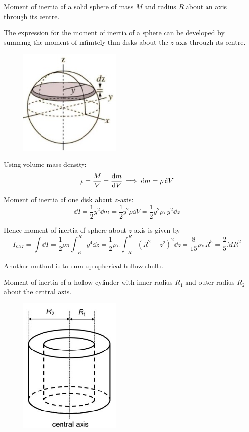 \begin{exmp}{}{}
Moment of inertia of a solid sphere of mass $M$ and radius $R$ about an axis through its centre.
\end{exmp}

\begin{solution}
The expression for the moment of inertia of a sphere can be developed by summing the moment of infinitely thin disks about the $z$-axis through its centre.

\begin{figure}[H]
    \centering
    \includegraphics[width=5cm]{images/moi_sphere.jpg}
\end{figure}

Using volume mass density:
\[ \rho = \frac{M}{V} = \dv{m}{V} \implies \dd{m} = \rho\dd{V} \]

Moment of inertia of one disk about $z$-axis:
\[ \dd{I} = \frac{1}{2}y^2\dd{m} = \frac{1}{2}y^2\rho\dd{V} = \frac{1}{2}y^2\rho\pi y^2\dd{z} \]

Hence moment of inertia of sphere about $z$-axis is given by
\[ I_{CM} = \int \dd{I} = \frac{1}{2}\rho\pi\int_{-R}^R y^4\dd{z} = \frac{1}{2}\rho\pi\int_{-R}^R (R^2-z^2)^2\dd{z} = \frac{8}{15}\rho\pi R^5 = \boxed{\frac{2}{5}MR^2} \]

\begin{remark}
Another method is to sum up spherical hollow shells.
\end{remark}
\end{solution}

\begin{exmp}{}{}
Moment of inertia of a hollow cylinder with inner radius $R_1$ and outer radius $R_2$ about the central axis.
\end{exmp}

\begin{figure}[H]
    \centering
    \includegraphics[width=5cm]{images/moi_hollow_cylinder.jpg}
\end{figure}

